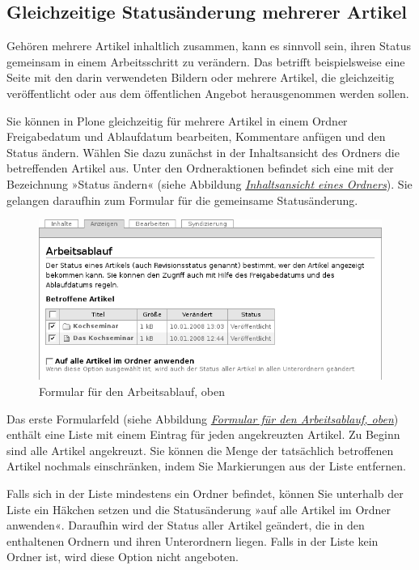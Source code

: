 \documentclass[a4paper,12pt,ngerman]{manual}
\begin{document}
\subsection{Gleichzeitige Statusänderung mehrerer Artikel}

Gehören mehrere Artikel inhaltlich zusammen, kann es sinnvoll sein, ihren
Status gemeinsam in einem Arbeitsschritt zu verändern.  Das betrifft
beispielsweise eine Seite mit den darin verwendeten Bildern oder mehrere
Artikel, die gleichzeitig veröffentlicht oder aus dem öffentlichen Angebot
herausgenommen werden sollen.

Sie können in Plone gleichzeitig für mehrere Artikel in einem Ordner
Freigabedatum und Ablaufdatum bearbeiten, Kommentare anfügen und den Status
ändern. Wählen Sie dazu zunächst in der Inhaltsansicht des Ordners die
betreffenden Artikel aus. Unter den Ordneraktionen befindet sich eine mit der
Bezeichnung »Status ändern« (siehe Abbildung \hyperlink{fig-ordnerinhalt}{\emph{Inhaltsansicht eines Ordners}}). Sie
gelangen daraufhin zum Formular für die gemeinsame Statusänderung.
\hypertarget{fig-publikationsprozess-1}{}\begin{figure}[htbp]
\centering

\includegraphics{publikationsprozess-1.png}
\caption{Formular für den Arbeitsablauf, oben}\end{figure}

Das erste Formularfeld (siehe Abbildung
\hyperlink{fig-publikationsprozess-1}{\emph{Formular für den Arbeitsablauf, oben}}) enthält eine Liste mit einem Eintrag
für jeden angekreuzten Artikel. Zu Beginn sind alle Artikel
angekreuzt. Sie können die Menge der tatsächlich betroffenen Artikel
nochmals einschränken, indem Sie Markierungen aus der Liste entfernen.

Falls sich in der Liste mindestens ein Ordner befindet, können Sie
unterhalb der Liste ein Häkchen setzen und die Statusänderung »auf
alle Artikel im Ordner anwenden«. Daraufhin wird der Status aller
Artikel geändert, die in den enthaltenen Ordnern und ihren
Unterordnern liegen. Falls in der Liste kein Ordner ist, wird diese
Option nicht angeboten.
\end{document}
